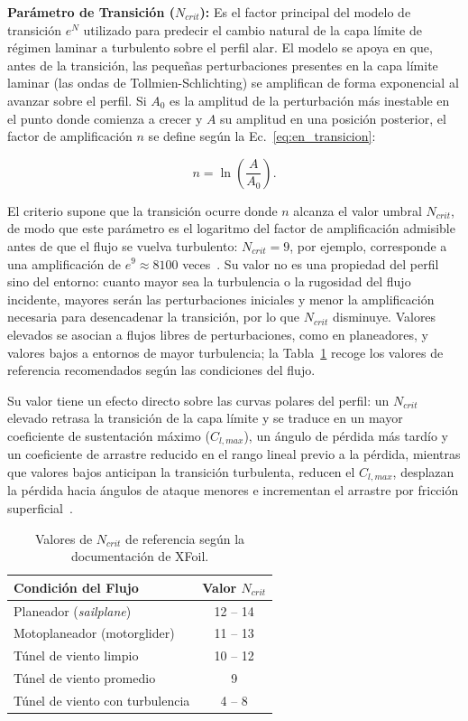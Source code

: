 \textbf{Parámetro de Transición ($N_{crit}$):} Es el factor principal del modelo de transición $e^N$ utilizado para predecir el cambio natural de la capa límite de régimen laminar a turbulento sobre el perfil alar. El modelo se apoya en que, antes de la transición, las pequeñas perturbaciones presentes en la capa límite laminar (las ondas de Tollmien-Schlichting) se amplifican de forma exponencial al avanzar sobre el perfil. Si $A_0$ es la amplitud de la perturbación más inestable en el punto donde comienza a crecer y $A$ su amplitud en una posición posterior, el factor de amplificación $n$ se define según la Ec.~\ref{eq:en_transicion}:

\begin{equation}
n = \ln\left( \frac{A}{A_0} \right).
\label{eq:en_transicion}
\end{equation}

El criterio supone que la transición ocurre donde $n$ alcanza el valor umbral $N_{crit}$, de modo que este parámetro es el logaritmo del factor de amplificación admisible antes de que el flujo se vuelva turbulento: $N_{crit} = 9$, por ejemplo, corresponde a una amplificación de $e^{9} \approx 8100$ veces~\parencite{drela1989xfoil}. Su valor no es una propiedad del perfil sino del entorno: cuanto mayor sea la turbulencia o la rugosidad del flujo incidente, mayores serán las perturbaciones iniciales y menor la amplificación necesaria para desencadenar la transición, por lo que $N_{crit}$ disminuye. Valores elevados se asocian a flujos libres de perturbaciones, como en planeadores, y valores bajos a entornos de mayor turbulencia; la Tabla~\ref{tab:ncrit_values} recoge los valores de referencia recomendados según las condiciones del flujo.

Su valor tiene un efecto directo sobre las curvas polares del perfil: un $N_{crit}$ elevado retrasa la transición de la capa límite y se traduce en un mayor coeficiente de sustentación máximo ($C_{l,max}$), un ángulo de pérdida más tardío y un coeficiente de arrastre reducido en el rango lineal previo a la pérdida, mientras que valores bajos anticipan la transición turbulenta, reducen el $C_{l,max}$, desplazan la pérdida hacia ángulos de ataque menores e incrementan el arrastre por fricción superficial~\parencite{drela1989xfoil}.

\begin{table}[H]
    \centering
    \caption{Valores de $N_{crit}$ de referencia según la documentación de XFoil.}
    \label{tab:ncrit_values}
    \begin{tabular}{lc}
        \hline
        \textbf{Condición del Flujo} & \textbf{Valor $N_{crit}$}\\
        \hline
        Planeador (\textit{sailplane}) & 12 -- 14 \\
        Motoplaneador (motorglider)        & 11 -- 13 \\
        Túnel de viento limpio             & 10 -- 12 \\
        Túnel de viento promedio           & 9        \\
        Túnel de viento con turbulencia    & 4 -- 8   \\
        \hline
    \end{tabular}
\end{table}

